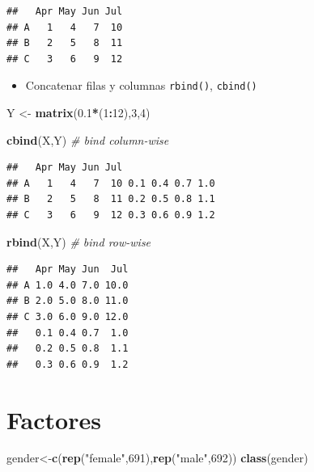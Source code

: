 \documentclass[]{book}
\newenvironment{Shaded}{\begin{snugshade}}{\end{snugshade}}
\newcommand{\KeywordTok}[1]{\textcolor[rgb]{0.13,0.29,0.53}{\textbf{#1}}}
\newcommand{\DecValTok}[1]{\textcolor[rgb]{0.00,0.00,0.81}{#1}}
\newcommand{\FloatTok}[1]{\textcolor[rgb]{0.00,0.00,0.81}{#1}}
\newcommand{\StringTok}[1]{\textcolor[rgb]{0.31,0.60,0.02}{#1}}
\newcommand{\CommentTok}[1]{\textcolor[rgb]{0.56,0.35,0.01}{\textit{#1}}}
\newcommand{\OperatorTok}[1]{\textcolor[rgb]{0.81,0.36,0.00}{\textbf{#1}}}
\newcommand{\NormalTok}[1]{#1}
\providecommand{\tightlist}{%
  \setlength{\itemsep}{0pt}\setlength{\parskip}{0pt}}
\begin{document}
\begin{verbatim}
##   Apr May Jun Jul
## A   1   4   7  10
## B   2   5   8  11
## C   3   6   9  12
\end{verbatim}

\begin{itemize}
\tightlist
\item
  Concatenar filas y columnas \texttt{rbind()}, \texttt{cbind()}
\end{itemize}

\begin{Shaded}
\begin{Highlighting}[]
\NormalTok{Y <-}\StringTok{ }\KeywordTok{matrix}\NormalTok{(}\FloatTok{0.1}\OperatorTok{*}\NormalTok{(}\DecValTok{1}\OperatorTok{:}\DecValTok{12}\NormalTok{),}\DecValTok{3}\NormalTok{,}\DecValTok{4}\NormalTok{)}

\KeywordTok{cbind}\NormalTok{(X,Y)  }\CommentTok{# bind column-wise}
\end{Highlighting}
\end{Shaded}

\begin{verbatim}
##   Apr May Jun Jul                
## A   1   4   7  10 0.1 0.4 0.7 1.0
## B   2   5   8  11 0.2 0.5 0.8 1.1
## C   3   6   9  12 0.3 0.6 0.9 1.2
\end{verbatim}

\begin{Shaded}
\begin{Highlighting}[]
\KeywordTok{rbind}\NormalTok{(X,Y)  }\CommentTok{# bind row-wise}
\end{Highlighting}
\end{Shaded}

\begin{verbatim}
##   Apr May Jun  Jul
## A 1.0 4.0 7.0 10.0
## B 2.0 5.0 8.0 11.0
## C 3.0 6.0 9.0 12.0
##   0.1 0.4 0.7  1.0
##   0.2 0.5 0.8  1.1
##   0.3 0.6 0.9  1.2
\end{verbatim}

\section{Factores}\label{factores}

\begin{Shaded}
\begin{Highlighting}[]
\NormalTok{gender<-}\KeywordTok{c}\NormalTok{(}\KeywordTok{rep}\NormalTok{(}\StringTok{"female"}\NormalTok{,}\DecValTok{691}\NormalTok{),}\KeywordTok{rep}\NormalTok{(}\StringTok{"male"}\NormalTok{,}\DecValTok{692}\NormalTok{))}
\KeywordTok{class}\NormalTok{(gender)}
\end{Highlighting}
\end{Shaded}
\end{document}
